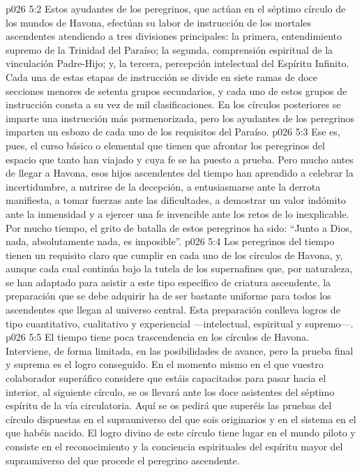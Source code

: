 \vs p026 5:2 Estos ayudantes de los peregrinos, que actúan en el séptimo círculo de los mundos de Havona, efectúan su labor de instrucción de los mortales ascendentes atendiendo a tres divisiones principales: la primera, entendimiento supremo de la Trinidad del Paraíso; la segunda, comprensión espiritual de la vinculación Padre\hyp{}Hijo; y, la tercera, percepción intelectual del Espíritu Infinito. Cada una de estas etapas de instrucción se divide en siete ramas de doce secciones menores de setenta grupos secundarios, y cada uno de estos grupos de instrucción consta a su vez de mil clasificaciones. En los círculos posteriores se imparte una instrucción más pormenorizada, pero los ayudantes de los peregrinos imparten un esbozo de cada uno de los requisitos del Paraíso.
\vs p026 5:3 Ese es, pues, el curso básico o elemental que tienen que afrontar los peregrinos del espacio que tanto han viajado y cuya fe se ha puesto a prueba. Pero mucho antes de llegar a Havona, esos hijos ascendentes del tiempo han aprendido a celebrar la incertidumbre, a nutrirse de la decepción, a entusiasmarse ante la derrota manifiesta, a tomar fuerzas ante las dificultades, a demostrar un valor indómito ante la inmensidad y a ejercer una fe invencible ante los retos de lo inexplicable. Por mucho tiempo, el grito de batalla de estos peregrinos ha sido: “Junto a Dios, nada, absolutamente nada, es imposible”.
\vs p026 5:4 Los peregrinos del tiempo tienen un requisito claro que cumplir en cada uno de los círculos de Havona, y, aunque cada cual continúa bajo la tutela de los supernafines que, por naturaleza, se han adaptado para asistir a este tipo específico de criatura ascendente, la preparación que se debe adquirir ha de ser bastante uniforme para todos los ascendentes que llegan al universo central. Esta preparación conlleva logros de tipo cuantitativo, cualitativo y experiencial ---intelectual, espiritual y supremo---.
\vs p026 5:5 El tiempo tiene poca trascendencia en los círculos de Havona. Interviene, de forma limitada, en las posibilidades de avance, pero la prueba final y suprema es el logro conseguido. En el momento mismo en el que vuestro colaborador superáfico considere que estáis capacitados para pasar hacia el interior, al siguiente círculo, se os llevará ante los doce asistentes del séptimo espíritu de la vía circulatoria. Aquí se os pedirá que superéis las pruebas del círculo dispuestas en el suprauniverso del que sois originarios y en el sistema en el que habéis nacido. El logro divino de este círculo tiene lugar en el mundo piloto y consiste en el reconocimiento y la conciencia espirituales del espíritu mayor del suprauniverso del que procede el peregrino ascendente.
